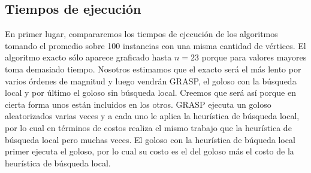 \subsection{Tiempos de ejecución}
En primer lugar, compararemos los tiempos de ejecución de los algoritmos tomando el promedio
sobre 100 instancias con una misma cantidad de vértices. El algoritmo exacto sólo
aparece graficado hasta $n=23$ porque para valores mayores toma demasiado tiempo.
Nosotros estimamos que el exacto será el más lento por varios órdenes de magnitud y luego
vendrán GRASP, el goloso con la búsqueda local y por último el goloso sin búsqueda local. Creemos que será así
porque en cierta forma unos están incluidos en los otros. GRASP ejecuta un goloso aleatorizados
varias veces y a cada uno le aplica la heurística de búsqueda local, por lo cual en términos
de costos realiza el mismo trabajo que la heurística de búsqueda local pero muchas veces.
El goloso con la heurística de búqueda local primer ejecuta el goloso, por lo cual su costo
es el del goloso más el costo de la heurística de búsqueda local.

